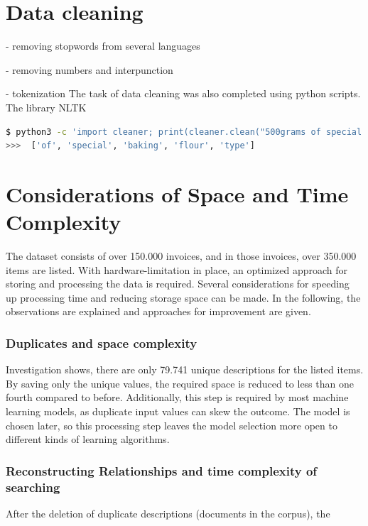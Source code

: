 	
	\section{Data cleaning}
    - removing stopwords from several languages
        
    - removing numbers and interpunction
    
    - tokenization
	The task of data cleaning was also completed using python scripts. The library \ac{NLTK}
	
\begin{lstlisting}[language=sh]
$ python3 -c 'import cleaner; print(cleaner.clean("500grams of special baking flour type 504"))' \\
>>>  ['of', 'special', 'baking', 'flour', 'type']
\end{lstlisting}
	 
	\section{Considerations of Space and Time Complexity}
	The dataset consists of over 150.000 invoices, and in those invoices, over 350.000 items are listed. 
	With hardware-limitation in place, an optimized approach for storing and processing the data is required. 
	Several considerations for speeding up processing time and reducing storage space can be made. 
	In the following, the observations are explained and approaches for improvement are given.

		\subsubsection{Duplicates and space complexity}
		Investigation shows, there are only 79.741 unique descriptions for the listed items. By saving only the unique values, the required space is reduced to less than one fourth compared to before. Additionally, this step is required by most machine learning models, as duplicate input values can skew the outcome. The model is chosen later, so this processing step leaves the model selection more open to different kinds of learning algorithms.
		
		\subsubsection{Reconstructing Relationships and time complexity of searching}
		After the deletion of duplicate descriptions (documents in the corpus), the 
		
